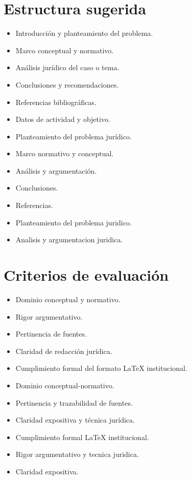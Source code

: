 \documentclass[12pt]{article}
\begin{document}
\section*{Estructura sugerida}
\begin{itemize}[leftmargin=*]
  \item Introducción y planteamiento del problema.
  \item Marco conceptual y normativo.
  \item Análisis jurídico del caso o tema.
  \item Conclusiones y recomendaciones.
  \item Referencias bibliográficas.
  \item Datos de actividad y objetivo.
  \item Planteamiento del problema jurídico.
  \item Marco normativo y conceptual.
  \item Análisis y argumentación.
  \item Conclusiones.
  \item Referencias.
  \item Planteamiento del problema juridico.
  \item Analisis y argumentacion juridica.
\end{itemize}

\section*{Criterios de evaluación}
\begin{itemize}[leftmargin=*]
  \item Dominio conceptual y normativo.
  \item Rigor argumentativo.
  \item Pertinencia de fuentes.
  \item Claridad de redacción jurídica.
  \item Cumplimiento formal del formato LaTeX institucional.
  \item Dominio conceptual-normativo.
  \item Pertinencia y trazabilidad de fuentes.
  \item Claridad expositiva y técnica jurídica.
  \item Cumplimiento formal LaTeX institucional.
  \item Rigor argumentativo y tecnica juridica.
  \item Claridad expositiva.
\end{itemize}
\end{document}
